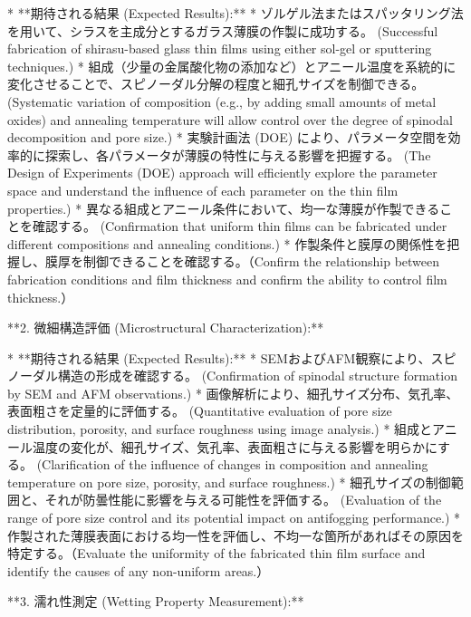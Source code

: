\documentclass{article}
\begin{document}
*   **期待される結果 (Expected Results):**
    *   ゾルゲル法またはスパッタリング法を用いて、シラスを主成分とするガラス薄膜の作製に成功する。 (Successful fabrication of shirasu-based glass thin films using either sol-gel or sputtering techniques.)
    *   組成（少量の金属酸化物の添加など）とアニール温度を系統的に変化させることで、スピノーダル分解の程度と細孔サイズを制御できる。 (Systematic variation of composition (e.g., by adding small amounts of metal oxides) and annealing temperature will allow control over the degree of spinodal decomposition and pore size.)
    *   実験計画法 (DOE) により、パラメータ空間を効率的に探索し、各パラメータが薄膜の特性に与える影響を把握する。 (The Design of Experiments (DOE) approach will efficiently explore the parameter space and understand the influence of each parameter on the thin film properties.)
    *   異なる組成とアニール条件において、均一な薄膜が作製できることを確認する。 (Confirmation that uniform thin films can be fabricated under different compositions and annealing conditions.)
    *   作製条件と膜厚の関係性を把握し、膜厚を制御できることを確認する。（Confirm the relationship between fabrication conditions and film thickness and confirm the ability to control film thickness.）

**2. 微細構造評価 (Microstructural Characterization):**

*   **期待される結果 (Expected Results):**
    *   SEMおよびAFM観察により、スピノーダル構造の形成を確認する。 (Confirmation of spinodal structure formation by SEM and AFM observations.)
    *   画像解析により、細孔サイズ分布、気孔率、表面粗さを定量的に評価する。 (Quantitative evaluation of pore size distribution, porosity, and surface roughness using image analysis.)
    *   組成とアニール温度の変化が、細孔サイズ、気孔率、表面粗さに与える影響を明らかにする。 (Clarification of the influence of changes in composition and annealing temperature on pore size, porosity, and surface roughness.)
    *   細孔サイズの制御範囲と、それが防曇性能に影響を与える可能性を評価する。 (Evaluation of the range of pore size control and its potential impact on antifogging performance.)
    *   作製された薄膜表面における均一性を評価し、不均一な箇所があればその原因を特定する。（Evaluate the uniformity of the fabricated thin film surface and identify the causes of any non-uniform areas.）

**3. 濡れ性測定 (Wetting Property Measurement):**
\end{document}
